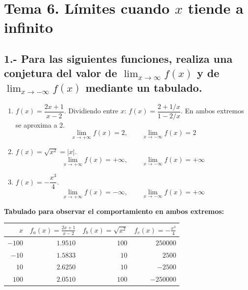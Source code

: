 \documentclass[12pt, letterpaper]{article}
\makeatletter
\renewcommand{\alph}[1]{\expandafter\@alphlatin\csname c@#1\endcsname}
\newcommand{\@alphlatin}[1]{\ifcase#1\or a\or b\or c\or d\or e\or f\or g\or h\or i\or j\or k\or l\or m\or n\or o\or p\or q\or r\or s\or t\or u\or v\or w\or x\or y\or z\else\@ctrerr\fi}
\newcommand{\respuesta}[1]{\[\boxed{#1}\]}
\makeatother
\begin{document}

\newpage
\section{Tema 6. Límites cuando $x$ tiende a infinito}

\subsection*{1.- Para las siguientes funciones, realiza una conjetura del valor de $\lim_{x\to\infty}f(x)$ y de $\lim_{x\to-\infty}f(x)$ mediante un tabulado.}
\begin{enumerate}[label=\alph*)]
  \item $f(x)=\dfrac{2x+1}{x-2}$. Dividiendo entre $x$: $f(x)=\dfrac{2+1/x}{1-2/x}$. En ambos extremos se aproxima a $2$.\\
  \respuesta{\lim_{x\to+\infty}f(x)=2,\qquad\lim_{x\to-\infty}f(x)=2}
  \item $f(x)=\sqrt{x^2}=|x|$.\\
  \respuesta{\lim_{x\to+\infty}f(x)=+\infty,\qquad\lim_{x\to-\infty}f(x)=+\infty}
  \item $f(x)=-\dfrac{x^3}{4}$.\\
  \respuesta{\lim_{x\to+\infty}f(x)=-\infty,\qquad\lim_{x\to-\infty}f(x)=+\infty}
\end{enumerate}
\textbf{Tabulado para observar el comportamiento en ambos extremos:}
\begin{center}
\begin{tabular}{r|r|r|r}
$x$ & $f_a(x)=\frac{2x+1}{x-2}$ & $f_b(x)=\sqrt{x^2}$ & $f_c(x)=-\frac{x^3}{4}$\\\hline
$-100$ & $1.9510$ & $100$ & $250000$\\
$-10$ & $1.5833$ & $10$ & $2500$\\
$10$ & $2.6250$ & $10$ & $-2500$\\
$100$ & $2.0510$ & $100$ & $-250000$
\end{tabular}
\end{center}
\newpage
\end{document}
